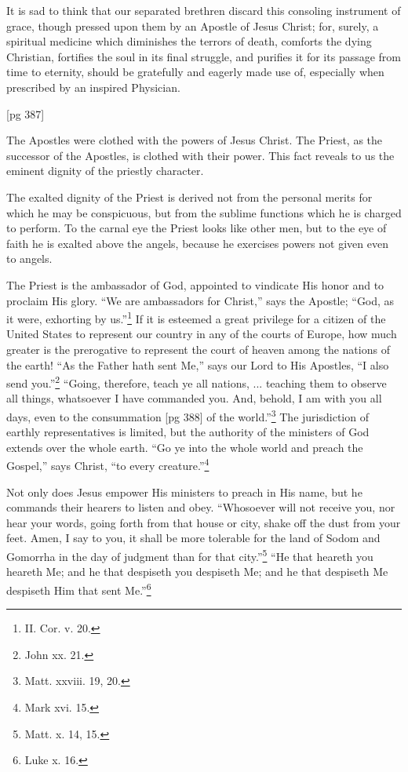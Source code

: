 It is sad to think that our separated brethren
discard this consoling instrument of grace, though
pressed upon them by an Apostle of Jesus Christ;
for, surely, a spiritual medicine which diminishes
the terrors of death, comforts the dying Christian,
fortifies the soul in its final struggle, and purifies
it for its passage from time to eternity, should be
gratefully and eagerly made use of, especially
when prescribed by an inspired Physician.

[pg 387]


The Apostles were clothed with the powers of
Jesus Christ. The Priest, as the successor
of the Apostles, is clothed with their power.
This fact reveals to us the eminent dignity of the
priestly character.

The exalted dignity of the Priest is derived not
from the personal merits for which he may be conspicuous,
but from the sublime functions which he
is charged to perform. To the carnal eye the
Priest looks like other men, but to the eye of faith
he is exalted above the angels, because he exercises
powers not given even to angels.

The Priest is the ambassador of God, appointed
to vindicate His honor and to proclaim His glory.
“We are ambassadors for Christ,” says the Apostle;
“God, as it were, exhorting by us.”\footnote{II.
Cor. v. 20.} If it is
esteemed a great privilege for a citizen of the
United States to represent our country in any of
the courts of Europe, how much greater is the
prerogative to represent the court of heaven
among the nations of the earth! “As the Father
hath sent Me,” says our Lord to His Apostles, “I
also send you.”\footnote{John xx.
21.} “Going, therefore, teach ye all
nations, ... teaching them to observe all things,
whatsoever I have commanded you. And, behold,
I am with you all days, even to the consummation
[pg 388]
of the world.”\footnote{Matt. xxviii. 19,
20.} The jurisdiction of earthly representatives
is limited, but the authority of the
ministers of God extends over the whole earth.
“Go ye into the whole world and preach the Gospel,”
says Christ, “to every creature.”\footnote{Mark xvi. 15.}

Not only does Jesus empower His ministers to
preach in His name, but he commands their
hearers to listen and obey. “Whosoever will not
receive you, nor hear your words, going forth
from that house or city, shake off the dust from
your feet. Amen, I say to you, it shall be more
tolerable for the land of Sodom and Gomorrha in
the day of judgment than for that city.”\footnote{Matt.
x. 14, 15.} “He
that heareth you heareth Me; and he that
despiseth you despiseth Me; and he that despiseth
Me despiseth Him that sent Me.”\footnote{Luke x. 16.}

